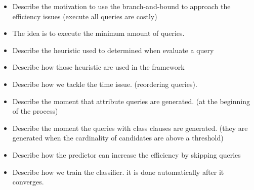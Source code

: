 \begin{itemize}
\item Describe the motivation to use the branch-and-bound to approach the efficiency issues (execute all queries are costly)
\item The idea is to execute the minimum amount of queries.
\item Describe the heuristic used to determined when evaluate a query
\item Describe how those heuristic are used in the framework
\item Describe how we tackle the time issue.  (reordering queries).
\item Describe the moment  that attribute queries are generated. (at the beginning of the process)
\item Describe the moment the queries with class clauses are generated. (they are generated when the cardinality of candidates are above a threshold)
\item Describe how the predictor can increase the efficiency by skipping queries
\item Describe how we train the classifier. it is done automatically after it converges.
\end{itemize}





 

